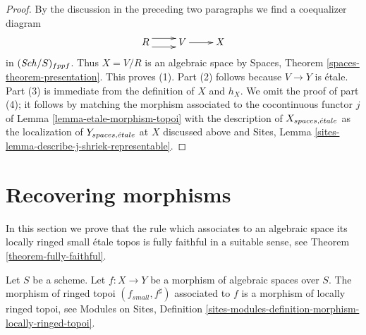 \begin{proof}
\medskip\noindent
By the discussion in the preceding two paragraphs we find a
coequalizer diagram
$$
\xymatrix{
R \ar@<1ex>[r] \ar@<-1ex>[r] &
V \ar[r] &
X
}
$$
in $(\mathit{Sch}/S)_{fppf}$. Thus $X = V/R$ is an algebraic space by
Spaces, Theorem \ref{spaces-theorem-presentation}. This proves (1).
Part (2) follows because $V \to Y$ is \'etale. Part (3) is immediate
from the definition of $X$ and $h_X$. We omit the proof of part (4);
it follows by matching the morphism associated to the cocontinuous
functor $j$ of Lemma \ref{lemma-etale-morphism-topoi}
with the description of $X_{spaces, {\acute{e}tale}}$ as the localization
of $Y_{spaces, {\acute{e}tale}}$ at $X$ discussed above and
Sites, Lemma \ref{sites-lemma-describe-j-shriek-representable}.
\end{proof}







\section{Recovering morphisms}
\label{section-morphisms}

\noindent
In this section we prove that the rule which associates to an algebraic space
its locally ringed small \'etale topos is fully faithful in a suitable
sense, see
Theorem \ref{theorem-fully-faithful}.

\begin{lemma}
\label{lemma-morphism-locally-ringed}
Let $S$ be a scheme.
Let $f : X \to Y$ be a morphism of algebraic spaces over $S$.
The morphism of ringed topoi $(f_{small}, f^\sharp)$
associated to $f$ is a morphism of locally ringed topoi, see
Modules on Sites,
Definition \ref{sites-modules-definition-morphism-locally-ringed-topoi}.
\end{lemma}

